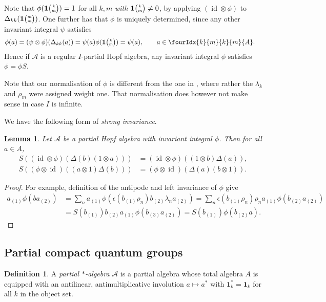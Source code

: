 \documentclass[10pt]{article}
\DeclareMathOperator{\id}{id}
\newcommand{\Grt}[3]{#1{\tiny {\begin{pmatrix} #2\\#3\end{pmatrix}}}}
\newcommand{\UnitC}[2]{\Grt{\mathbf{1}}{#1}{#2}}
\newcommand{\Gr}[5]{\fourIdx{#2}{#4}{#3}{#5}{#1}}%
\newtheorem{Lem}[Theorem]{Lemma}
\theoremstyle{definition}
\newtheorem{Def}[Theorem]{Definition}
\numberwithin{equation}{section}
\begin{document}
Note that $\phi(\UnitC{k}{m})=1$ for all $k,m$ \emph{with $\UnitC{k}{m}\neq 0$}, by applying $(\id\otimes \phi)$ to $\Delta_{kk}(\UnitC{m}{m})$. One further has that $\phi$ is uniquely determined, since any other invariant integral $\psi$ satisfies \begin{align*}  \phi(a)  &= (\psi \otimes
      \phi)(\Delta_{kk}(a)) = \psi(a)\phi(\UnitC{k}{m}) = \psi(a),\qquad a\in \Gr{A}{k}{k}{m}{m}.
    \end{align*}
Hence if $\mathscr{A}$ is a  regular  $I$-partial Hopf algebra, any invariant integral $\phi$ satisfies $\phi=\phi S$.

Note that our normalisation of $\phi$ is different from the one in \cite{Hay1}, where rather the $\lambda_k$ and $\rho_m$ were assigned weight one. That normalisation does however not make sense in case $I$ is infinite.

We have the following form of \emph{strong invariance}.

\begin{Lem} \label{lemma:strong-invariance}
  Let $\mathscr{A}$ be a partial Hopf algebra with invariant integral $\phi$. Then
  for all $a\in A$,
  \begin{align*}
    S\left(( \id\otimes
    \phi)(\Delta(b)(1 \otimes a))\right) &= (\id \otimes \phi)((1 \otimes b)\Delta(a)),\\  S\left((\phi \otimes
    \id)((a\otimes 1)\Delta(b))\right) &= (\phi \otimes \id)(\Delta(a)(b\otimes 1)).\end{align*}
\end{Lem}
\begin{proof}
 For example, definition of the antipode and left invariance of $\phi$ give
  \begin{align*}
    a_{(1)}\phi(ba_{(2)}) &= \sum_{n}
    a_{(1)}\phi(\epsilon(b_{(1)}\rho_{n})b_{(2)}\lambda_{n}a_{(2)}) 
= \sum_{n} \epsilon(b_{(1)}\rho_{n})\rho_{n}a_{(1)}\phi(b_{(2)}a_{(2)})
\\
&= S(b_{(1)})b_{(2)}a_{(1)}\phi(b_{(3)}a_{(2)}) =
S(b_{(1)})\phi(b_{(2)}a).
  \end{align*}
\end{proof}


\subsection{Partial compact quantum groups}
 
\begin{Def} A \emph{partial $*$-algebra} $\mathscr{A}$ is a partial
  algebra whose total algebra $A$ is equipped with an antilinear,
  antimultiplicative involution $ a\mapsto
  a^*$ with $\mathbf{1}_k^*=\mathbf{1}_k$ for all $k$ in
  the object set. 
\end{Def} 
\end{document}
